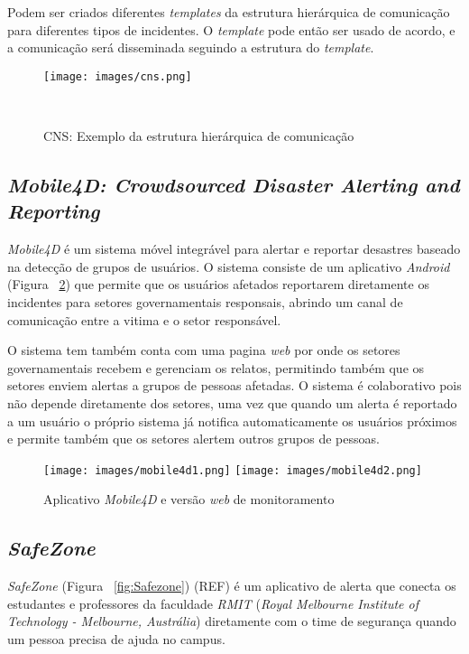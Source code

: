 \documentclass[	12pt, Times, openright, twoside, a4paper, english, brazil]{abntex2}
\begin{document}
Podem ser criados diferentes \textit{templates} da estrutura hierárquica de comunicação para diferentes tipos de incidentes. O \textit{template} pode então ser usado de acordo, e a comunicação será disseminada seguindo a estrutura do \textit{template}.

\begin{figure} [!h]
\centering
  \texttt{[image: images/cns.png]}
  \caption{CNS: Exemplo da estrutura hierárquica de comunicação}~\label{fig:cns}
\end{figure}

\subsection{\textit{Mobile4D: Crowdsourced Disaster Alerting and Reporting}}
\label{subsection:mobile4d}

\textit{Mobile4D} \cite{Frommberger:2013:MCD:2517899.2517925} é um sistema móvel integrável para alertar e reportar desastres baseado na detecção de grupos de usuários. O sistema consiste de um aplicativo \textit{Android} (Figura ~\ref{fig:mobile4d}) que permite que os usuários afetados reportarem diretamente os incidentes para setores governamentais responsais, abrindo um canal de comunicação entre a vitima e o setor responsável. 

O sistema tem também conta com uma pagina \textit{web} por onde os setores governamentais recebem e gerenciam os relatos, permitindo também que os setores enviem alertas a grupos de pessoas afetadas. O sistema é colaborativo pois não depende diretamente dos setores, uma vez que quando um alerta é reportado a um usuário o próprio sistema já notifica automaticamente os usuários próximos e permite também que os setores alertem outros grupos de pessoas.

\begin{figure}[h]
\centering %
\texttt{[image: images/mobile4d1.png]} %
\texttt{[image: images/mobile4d2.png]} %
\caption{Aplicativo \textit{Mobile4D} e versão \textit{web} de monitoramento}
\label{fig:mobile4d}
\end{figure}

\subsection{\textit{SafeZone}}
\label{subsection:safezone}
\textit{SafeZone} (Figura ~\ref{fig:Safezone}) (REF) é um aplicativo de alerta que conecta os estudantes e professores da faculdade \textit{RMIT} (\textit{Royal Melbourne Institute of Technology -  Melbourne, Austrália}) diretamente com o time de segurança quando um pessoa precisa de ajuda no campus. 
\end{document}
